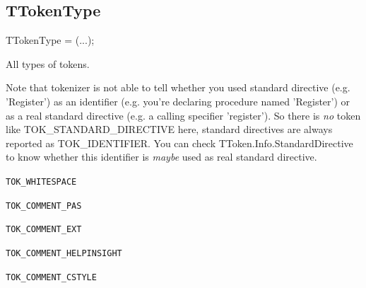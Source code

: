 \documentclass{report}
\newif\ifpdf
\begin{document}
\subsection*{TTokenType}
\fi
\label{PasDoc_Tokenizer-TTokenType}
\begin{list}{}{
\setlength{\itemindent}{0cm}
\setlength{\listparindent}{0cm}
\setlength{\leftmargin}{\evensidemargin}
\addtolength{\leftmargin}{\tmplength}
\settowidth{\labelsep}{X}
\addtolength{\leftmargin}{\labelsep}
\setlength{\labelwidth}{\tmplength}
}
\item[\textbf{Declaration}\hfill]
\ifpdf
\begin{flushleft}
\fi
\begin{ttfamily}
TTokenType = (...);\end{ttfamily}

\ifpdf
\end{flushleft}
\fi

\par
\item[\textbf{Description}]
All types of tokens.

Note that tokenizer is not able to tell whether you used standard directive (e.g. 'Register') as an identifier (e.g. you're declaring procedure named 'Register') or as a real standard directive (e.g. a calling specifier 'register'). So there is \textit{no} token like TOK{\_}STANDARD{\_}DIRECTIVE here, standard directives are always reported as TOK{\_}IDENTIFIER. You can check TToken.Info.StandardDirective to know whether this identifier is \textit{maybe} used as real standard directive.\item[\textbf{Values}]
\begin{description}
\item[\texttt{TOK{\_}WHITESPACE}] \label{PasDoc_Tokenizer-TOK_WHITESPACE}
\index{}
 
\item[\texttt{TOK{\_}COMMENT{\_}PAS}] \label{PasDoc_Tokenizer-TOK_COMMENT_PAS}
\index{}
 
\item[\texttt{TOK{\_}COMMENT{\_}EXT}] \label{PasDoc_Tokenizer-TOK_COMMENT_EXT}
\index{}
 
\item[\texttt{TOK{\_}COMMENT{\_}HELPINSIGHT}] \label{PasDoc_Tokenizer-TOK_COMMENT_HELPINSIGHT}
\index{}
 
\item[\texttt{TOK{\_}COMMENT{\_}CSTYLE}] \label{PasDoc_Tokenizer-TOK_COMMENT_CSTYLE}
\index{}
 

\end{description}
\end{list}
\end{document}
